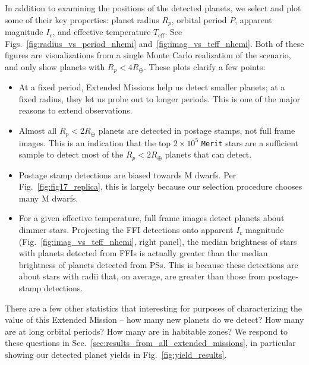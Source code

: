 In addition to examining the positions of the detected planets, we select and plot some of their key properties:
planet radius $R_p$, orbital period $P$, apparent magnitude $I_c$, and effective temperature $T_\mathrm{eff}$.
See Figs.~\ref{fig:radius_vs_period_nhemi} and~\ref{fig:imag_vs_teff_nhemi}.
Both of these figures are visualizations from a single Monte Carlo realization of the \npole\:scenario, and only show planets with $R_p < 4R_\oplus$.
These plots clarify a few points:
\begin{itemize}
	\item At a fixed period, Extended Missions help us detect smaller planets; at a fixed radius, they let us probe out to longer periods. This is one of the major reasons to extend \tesss observations.
	\item Almost all $R_p<2R_\oplus$ planets are detected in postage stamps, not full frame images. This is an indication that the top $2\times10^5$ \texttt{Merit} stars are a sufficient sample to detect most of the $R_p<2R_\oplus$ planets that \tess can detect.
	\item Postage stamp detections are biased towards M dwarfs. Per Fig.~\ref{fig:fig17_replica}, this is largely because our selection procedure chooses many M dwarfs.
	\item For a given effective temperature, full frame images detect planets about dimmer stars. Projecting the FFI detections onto apparent $I_c$ magnitude (Fig.~\ref{fig:imag_vs_teff_nhemi}, right panel), the median brightness of stars with planets detected from FFIs is actually greater than the median brightness of planets detected from PSs. This is because these detections are about stars with radii that, on average, are greater than those from postage-stamp detections.
\end{itemize}

There are a few other statistics that interesting for purposes of characterizing the value of this Extended Mission -- how many new planets do we detect? How many are at long orbital periods? How many are in habitable zones? We respond to these questions in Sec.~\ref{sec:results_from_all_extended_missions}, in particular showing our detected planet yields in Fig.~\ref{fig:yield_results}.
